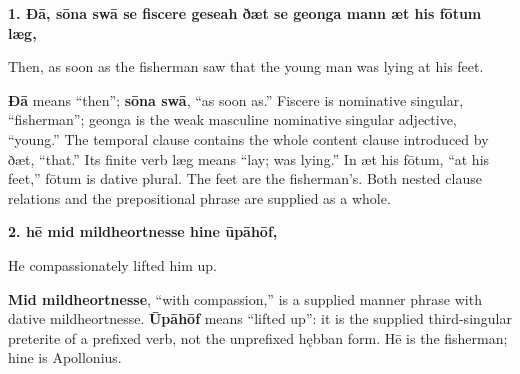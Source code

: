 \textbf{1. Ðā, sōna swā se fiscere geseah ðæt se geonga mann æt his fōtum læg,}

Then, as soon as the fisherman saw that the young man was lying at his feet.

\textbf{Ðā} means “then”; \textbf{sōna swā}, “as soon as.” Fiscere is nominative singular, “fisherman”; geonga is the weak masculine nominative singular adjective, “young.” The temporal clause contains the whole content clause introduced by ðæt, “that.” Its finite verb læg means “lay; was lying.” In æt his fōtum, “at his feet,” fōtum is dative plural. The feet are the fisherman’s. Both nested clause relations and the prepositional phrase are supplied as a whole.

\textbf{2. hē mid mildheortnesse hine ūpāhōf,}

He compassionately lifted him up.

\textbf{Mid mildheortnesse}, “with compassion,” is a supplied manner phrase with dative mildheortnesse. \textbf{Ūpāhōf} means “lifted up”: it is the supplied third-singular preterite of a prefixed verb, not the unprefixed hębban form. Hē is the fisherman; hine is Apollonius.

